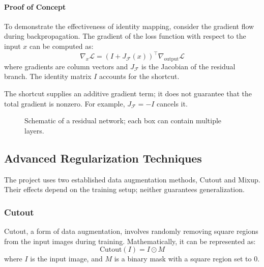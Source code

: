 \documentclass[12pt]{article}
\begin{document}
\paragraph{Proof of Concept}
To demonstrate the effectiveness of identity mapping, consider the gradient flow during backpropagation. The gradient of the loss function with respect to the input \(x\) can be computed as:
\begin{equation}
    \nabla_x \mathcal{L} =
    \left(I + J_{\mathcal{F}}(x)\right)^\top \nabla_{\text{output}}\mathcal{L}
\end{equation}
where gradients are column vectors and \(J_{\mathcal{F}}\) is the Jacobian of the residual branch. The identity matrix \(I\) accounts for the shortcut.

The shortcut supplies an additive gradient term; it does not guarantee that the total gradient is nonzero. For example, \(J_{\mathcal{F}}=-I\) cancels it.


\begin{figure}[h!]
\centering
{}
\caption{Schematic of a residual network; each box can contain multiple layers.}
\end{figure}


\subsection{Advanced Regularization Techniques}
The project uses two established data augmentation methods, Cutout and Mixup. Their effects depend on the training setup; neither guarantees generalization.

\subsubsection{Cutout}
Cutout, a form of data augmentation, involves randomly removing square regions from the input images during training. Mathematically, it can be represented as:
\begin{equation}
  \text{Cutout}(I) = I \odot M
\end{equation}
where \(I\) is the input image, and \(M\) is a binary mask with a square region set to 0.
\end{document}
